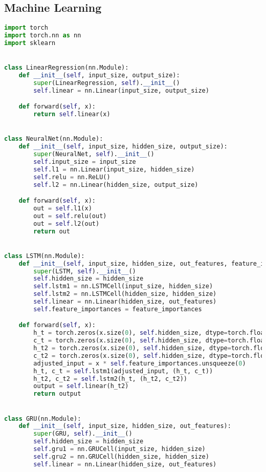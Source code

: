 \subsection{Machine Learning}
\label{subsec:code_ml}

\begin{lstlisting}[language=Python,label={lst:ml.py}, basicstyle=\scriptsize]
import torch
import torch.nn as nn
import sklearn


class LinearRegression(nn.Module):
    def __init__(self, input_size, output_size):
        super(LinearRegression, self).__init__()
        self.linear = nn.Linear(input_size, output_size)

    def forward(self, x):
        return self.linear(x)


class NeuralNet(nn.Module):
    def __init__(self, input_size, hidden_size, output_size):
        super(NeuralNet, self).__init__()
        self.input_size = input_size
        self.l1 = nn.Linear(input_size, hidden_size)
        self.relu = nn.ReLU()
        self.l2 = nn.Linear(hidden_size, output_size)

    def forward(self, x):
        out = self.l1(x)
        out = self.relu(out)
        out = self.l2(out)
        return out


class LSTM(nn.Module):
    def __init__(self, input_size, hidden_size, out_features, feature_importances):
        super(LSTM, self).__init__()
        self.hidden_size = hidden_size
        self.lstm1 = nn.LSTMCell(input_size, hidden_size)
        self.lstm2 = nn.LSTMCell(hidden_size, hidden_size)
        self.linear = nn.Linear(hidden_size, out_features)
        self.feature_importances = feature_importances

    def forward(self, x):
        h_t = torch.zeros(x.size(0), self.hidden_size, dtype=torch.float32)
        c_t = torch.zeros(x.size(0), self.hidden_size, dtype=torch.float32)
        h_t2 = torch.zeros(x.size(0), self.hidden_size, dtype=torch.float32)
        c_t2 = torch.zeros(x.size(0), self.hidden_size, dtype=torch.float32)
        adjusted_input = x * self.feature_importances.unsqueeze(0)
        h_t, c_t = self.lstm1(adjusted_input, (h_t, c_t))
        h_t2, c_t2 = self.lstm2(h_t, (h_t2, c_t2))
        output = self.linear(h_t2)
        return output


class GRU(nn.Module):
    def __init__(self, input_size, hidden_size, out_features):
        super(GRU, self).__init__()
        self.hidden_size = hidden_size
        self.gru1 = nn.GRUCell(input_size, hidden_size)
        self.gru2 = nn.GRUCell(hidden_size, hidden_size)
        self.linear = nn.Linear(hidden_size, out_features)


\end{lstlisting}

